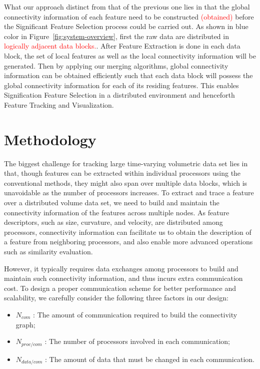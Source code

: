 \documentclass[10pt, conference, compsocconf]{IEEEtran}
\begin{document}
What our approach distinct from that of the previous one lies in that the global connectivity information of each feature need to be constructed \textcolor{red}{(obtained)} before the Significant Feature Selection process could be carried out. As shown in blue color in Figure~\ref{fig:system-overview}, first the raw data are distributed in \textcolor{red}{logically adjacent data blocks.}. After Feature Extraction is done in each data block, the set of local features as well as the local connectivity information will be generated. Then by applying our merging algorithms, global connectivity information can be obtained efficiently such that each data block will possess the global connectivity information for each of its residing features. This enables Signification Feature Selection in a distributed environment and henceforth Feature Tracking and Visualization.

\section{Methodology}
The biggest challenge for tracking large time-varying volumetric data set lies in that, though features can be extracted within individual processors using the conventional methods, they might also span over multiple data blocks, which is unavoidable as the number of processors increases. To extract and trace a feature over a distributed volume data set, we need to build and maintain the connectivity information of the features across multiple nodes. As feature descriptors, such as size, curvature, and velocity, are distributed among processors, connectivity information can facilitate us to obtain the description of a feature from neighboring processors, and also enable more advanced operations such as similarity evaluation.

However, it typically requires data exchanges among processors to build and maintain such connectivity information, and thus incurs extra communication cost. To design a proper communication scheme for better performance and scalability, we carefully consider the following three factors in our design:

\begin{itemize}
	\item $N_{com}$ : The amount of communication required to build the connectivity graph;
	\item $N_{proc/com}$ : The number of processors involved in each communication;
	\item $N_{data/com}$ : The amount of data that must be changed in each communication.
\end{itemize}
\end{document}
